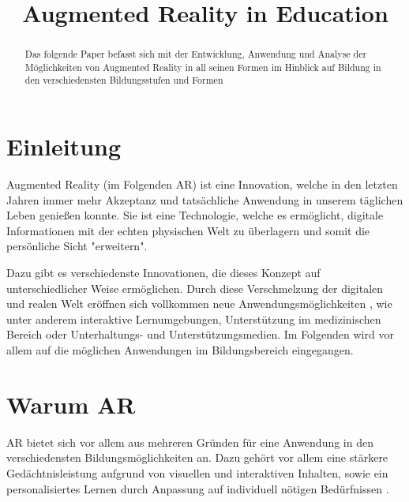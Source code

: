 \documentclass[conference]{IEEEtran}
\begin{document}
\title{Augmented Reality in Education
}

\author{
}
\maketitle

\begin{abstract}
Das folgende Paper befasst sich mit der Entwicklung, 
Anwendung und Analyse der Möglichkeiten von Augmented Reality 
in all seinen Formen im Hinblick auf Bildung in den verschiedensten Bildungsstufen und Formen
\end{abstract}

\section{Einleitung}
Augmented Reality (im Folgenden AR) ist eine Innovation, welche in den letzten
Jahren immer mehr Akzeptanz und tatsächliche Anwendung in unserem täglichen
Leben genießen konnte. Sie ist eine Technologie, welche es ermöglicht, digitale
Informationen mit der echten physischen Welt zu überlagern und somit die persönliche 
Sicht "erweitern". 

Dazu gibt es verschiedenste Innovationen, die dieses Konzept 
auf unterschiedlicher Weise ermöglichen. Durch diese Verschmelzung
der digitalen und realen Welt eröffnen sich vollkommen neue Anwendungsmöglichkeiten
, wie unter anderem interaktive Lernumgebungen, Unterstützung im medizinischen Bereich
oder Unterhaltungs- und Unterstützungsmedien. Im Folgenden wird vor allem auf die möglichen 
Anwendungen im Bildungsbereich eingegangen.


\section{Warum AR}

AR bietet sich vor allem aus mehreren Gründen für eine Anwendung in den verschiedensten
Bildungsmöglichkeiten an. Dazu gehört vor allem eine stärkere Gedächtnisleistung aufgrund von
visuellen und interaktiven Inhalten, sowie ein personalisiertes Lernen durch Anpassung 
auf individuell nötigen Bedürfnissen \cite{b1}. 
\end{document}
